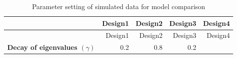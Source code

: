 \documentclass[num-refs]{wiley-article}
\begin{document}
\begin{longtable}[]{@{}rrrrr@{}}
\caption{\label{tab:parameter-settings} Parameter setting of simulated data
for model comparison}\tabularnewline
\toprule
\begin{minipage}[b]{0.35\columnwidth}\raggedleft\strut
~\strut
\end{minipage} & \begin{minipage}[b]{0.13\columnwidth}\raggedleft\strut
Design1\strut
\end{minipage} & \begin{minipage}[b]{0.13\columnwidth}\raggedleft\strut
Design2\strut
\end{minipage} & \begin{minipage}[b]{0.13\columnwidth}\raggedleft\strut
Design3\strut
\end{minipage} & \begin{minipage}[b]{0.13\columnwidth}\raggedleft\strut
Design4\strut
\end{minipage}\tabularnewline
\midrule
\endfirsthead
\toprule
\begin{minipage}[b]{0.35\columnwidth}\raggedleft\strut
~\strut
\end{minipage} & \begin{minipage}[b]{0.13\columnwidth}\raggedleft\strut
Design1\strut
\end{minipage} & \begin{minipage}[b]{0.13\columnwidth}\raggedleft\strut
Design2\strut
\end{minipage} & \begin{minipage}[b]{0.13\columnwidth}\raggedleft\strut
Design3\strut
\end{minipage} & \begin{minipage}[b]{0.13\columnwidth}\raggedleft\strut
Design4\strut
\end{minipage}\tabularnewline
\midrule
\endhead
\begin{minipage}[t]{0.35\columnwidth}\raggedleft\strut
\textbf{Decay of eigenvalues \((\gamma)\)}\strut
\end{minipage} & \begin{minipage}[t]{0.13\columnwidth}\raggedleft\strut
0.2\strut
\end{minipage} & \begin{minipage}[t]{0.13\columnwidth}\raggedleft\strut
0.8\strut
\end{minipage} & \begin{minipage}[t]{0.13\columnwidth}\raggedleft\strut
0.2\strut
\end{minipage} & \begin{minipage}[t]{0.13\columnwidth}\raggedleft\strut

\end{minipage}
\end{longtable}
\end{document}
